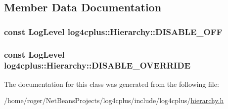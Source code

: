 \subsection{Member Data Documentation}
\hypertarget{classlog4cplus_1_1Hierarchy_ab772d872d4d7d11946a87580cff29f55}{
\subsubsection[{D\-I\-S\-A\-B\-L\-E\-\_\-\-O\-F\-F}]{\setlength{\rightskip}{0pt plus 5cm}const {\bf Log\-Level} log4cplus\-::\-Hierarchy\-::\-D\-I\-S\-A\-B\-L\-E\-\_\-\-O\-F\-F\hspace{0.3cm}{\ttfamily [static]}}}\label{classlog4cplus_1_1Hierarchy_ab772d872d4d7d11946a87580cff29f55}
\hypertarget{classlog4cplus_1_1Hierarchy_aec08bdb25b4dd2c8003afd821b7c7eca}{
\subsubsection[{D\-I\-S\-A\-B\-L\-E\-\_\-\-O\-V\-E\-R\-R\-I\-D\-E}]{\setlength{\rightskip}{0pt plus 5cm}const {\bf Log\-Level} log4cplus\-::\-Hierarchy\-::\-D\-I\-S\-A\-B\-L\-E\-\_\-\-O\-V\-E\-R\-R\-I\-D\-E\hspace{0.3cm}{\ttfamily [static]}}}\label{classlog4cplus_1_1Hierarchy_aec08bdb25b4dd2c8003afd821b7c7eca}


The documentation for this class was generated from the following file\-:\begin{DoxyCompactItemize}
\item 
/home/roger/\-Net\-Beans\-Projects/log4cplus/include/log4cplus/\hyperlink{hierarchy_8h}{hierarchy.\-h}\end{DoxyCompactItemize}

